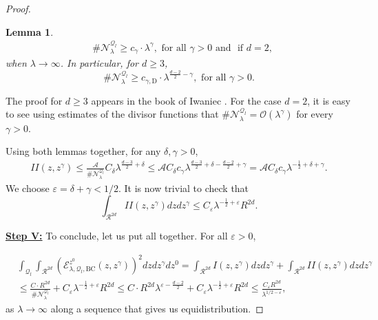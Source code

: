\documentclass{amsart}
\newtheorem{lemma}[theorem]{Lemma}
\theoremstyle{definition}
\theoremstyle{remark}
\newcommand{\ep}{\varepsilon}
\renewcommand\leq\leqslant
\renewcommand\geq\geqslant
\numberwithin{equation}{section}
\theoremstyle{definition}
\theoremstyle{remark}
\begin{document}
\begin{proof}
\begin{lemma}
\begin{equation}
\begin{aligned}
				&\#\mathcal{N}_\lambda^{\mathcal{Q}_l}\geq c_\gamma\cdot \lambda^{\gamma},\text{ for all }\gamma>0\text{ and }\text{ if }d=2,
			\end{aligned}
		\end{equation}when $\lambda\rightarrow\infty$. In particular, for $d\geq 3$, \begin{equation}
			\#\mathcal{N}_\lambda^{\mathcal{Q}_l}\geq c_{\gamma,\mathrm{D}}\cdot \lambda^{\frac{d-2}{2}-\gamma},\text{ for all }\gamma>0.
		\end{equation}
	\end{lemma}	The proof for $d\geq 3$ appears in the book of Iwaniec \cite[chapter 11]{Iwaniek}. For the case $d=2$, it is easy to see using estimates of the divisor functions that $\#\mathcal{N}_\lambda^{\mathcal{Q}_l}=\mathcal{O}\left(\lambda^\gamma\right)$ for every $\gamma>0$.
	
	Using both lemmas together, for any $\delta,\gamma>0$,
	\begin{equation}
		\begin{aligned}
			II(z,z^\gamma)\leq\frac{\mathcal{A}}{\#\mathcal{N}_\lambda^{\mathcal{Q}_l}}C_\delta\lambda^{\frac{d-3}{2}+\delta}\leq \mathcal{A}C_\delta c_\gamma \lambda^{\frac{d-3}{2}+\delta-\frac{d-2}{2}+\gamma}=\mathcal{A}C_\delta c_\gamma\lambda^{-\frac{1}{2}+\delta+\gamma}.
		\end{aligned}
	\end{equation}We choose $\ep=\delta+\gamma<1/2$.
	It is now trivial to check that 
	\begin{equation}
		\int_{\mathcal{R}^{2d}}II(z,z^\gamma)dzdz^\gamma\leq C_\ep\lambda^{-\frac{1}{2}+\ep}R^{2d}.
	\end{equation}
	
\textbf{	\underline{Step V:}} To conclude, let us put all together. For all $\ep>0$,
	
	\begin{equation}
		\begin{aligned}
			&\int_{\mathcal{Q}_l}\int_{\mathcal{R}^{2d}}\left(\mathcal{E}_{\lambda,\mathcal{Q}_l,\mathrm{BC}}^{z^0}(z,z^\gamma)\right)^2dzdz^\gamma dz^0=\int_{\mathcal{R}^{2d}}I(z,z^\gamma)dzdz^\gamma+\int_{\mathcal{R}^{2d}}II(z,z^\gamma)dzdz^\gamma \\
			&\leq \frac{C\cdot R^{2d}}{\#\mathcal{N}_\lambda^{\mathcal{Q}_l}}+ C_\ep\lambda^{-\frac{1}{2}+\ep}R^{2d}\leq C\cdot R^{2d}\lambda^{\ep-\frac{d-2}{2}}+ C_\ep\lambda^{-\frac{1}{2}+\ep}R^{2d}\leq \frac{C_\ep R^{2d}}{\lambda^{1/2-\ep}},
		\end{aligned}
	\end{equation}as $\lambda\rightarrow\infty$ along a sequence that gives us equidistribution.
	
\end{proof}
\end{document}
